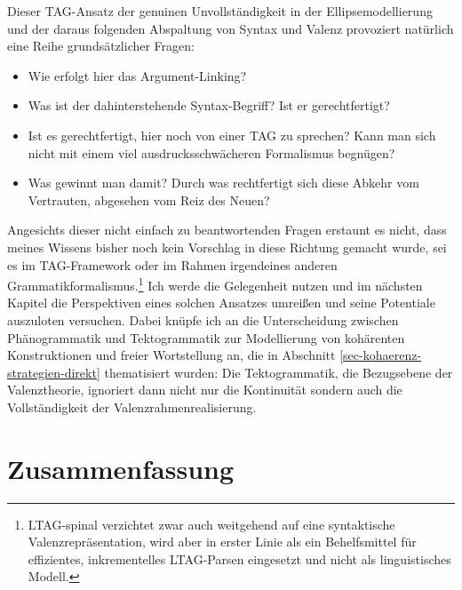 Dieser TAG-Ansatz der genuinen Unvollständigkeit in der Ellipsemodellierung und der daraus folgenden Abspaltung von Syntax und Valenz provoziert natürlich eine Reihe grundsätzlicher Fragen: 
\begin{itemize}
  \item Wie erfolgt hier das Argument-Linking?
  \item Was ist der dahinterstehende Syntax-Begriff? Ist er gerechtfertigt?
  \item Ist es gerechtfertigt, hier noch von einer TAG zu sprechen? Kann man sich nicht mit einem viel ausdrucksschwächeren Formalismus begnügen? 
  \item Was gewinnt man damit? Durch was rechtfertigt sich diese Abkehr vom Vertrauten, abgesehen vom Reiz des Neuen?
\end{itemize}
Angesichts dieser nicht einfach zu beantwortenden Fragen erstaunt es nicht, dass meines Wissens bisher noch kein Vorschlag in diese Richtung gemacht wurde, sei es im TAG-Framework oder im Rahmen irgendeines anderen Grammatikformalismus.\footnote{LTAG-spinal \citep{Shen:06,Shen:etal:08} verzichtet zwar auch weitgehend auf eine syntaktische Valenzrepräsentation, wird aber in erster Linie als ein Behelfsmittel für effizientes, inkrementelles LTAG-Parsen eingesetzt und nicht als linguistisches Modell.} Ich werde die Gelegenheit nutzen und im nächsten Kapitel die Perspektiven eines solchen Ansatzes umrei\ss en und seine Potentiale auszuloten versuchen. Dabei knüpfe ich an die Unterscheidung zwischen Phänogrammatik und Tektogrammatik zur Modellierung von kohärenten Konstruktionen und freier Wortstellung an, die in Abschnitt \ref{sec-kohaerenz-strategien-direkt} thematisiert wurden: Die Tektogrammatik, die Bezugsebene der Valenztheorie, ignoriert dann nicht nur die Kontinuität sondern auch die Vollständigkeit der Valenzrahmenrealisierung.  




\section{Zusammenfassung}

